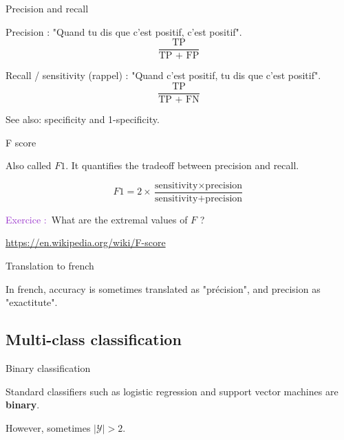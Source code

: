 \documentclass[usenames,dvipsnames,french]{beamer}
\newcounter{numexos}%
\newcommand{\exercice}[1]{%
\addtocounter{numexos}{1}%
\textcolor{DarkOrchid}{Exercice\,\thenumexos\,:}\,#1%
}
\begin{document}
\begin{frame}{Precision and recall}

    Precision : "Quand tu dis que c'est positif, c'est positif".
    \begin{equation}
        \frac{\text{TP}}{\text{TP + FP}}       
    \end{equation}

    Recall / sensitivity (rappel) : "Quand c'est positif, tu dis que c'est positif".
    \begin{equation}
        \frac{\text{TP}}{\text{TP + FN}}
    \end{equation}

    See also: specificity and 1-specificity.
    
\end{frame}

\begin{frame}{F score}

    Also called $F1$. It quantifies the tradeoff between precision and recall.

\begin{equation}
    F1 = 2 \times \frac{\text{sensitivity}\times \text{precision}}{\text{sensitivity}+ \text{precision}} 
\end{equation}

\exercice{\textbf{}} What are the extremal values of $F$ ?

    \url{https://en.wikipedia.org/wiki/F-score} 
    
\end{frame}

\begin{frame}{Translation to french}

    In french, accuracy is sometimes translated as "précision", and precision as
    "exactitute".
    
\end{frame}


\subsection{Multi-class classification}%
\label{sub:multi_class_classification}

\begin{frame}{Binary classification}

    Standard classifiers such as logistic regression and support vector
    machines are \textbf{{binary}}. 

    However, sometimes $|\mathcal{Y} |>2$.
    
\end{frame}
\end{document}
